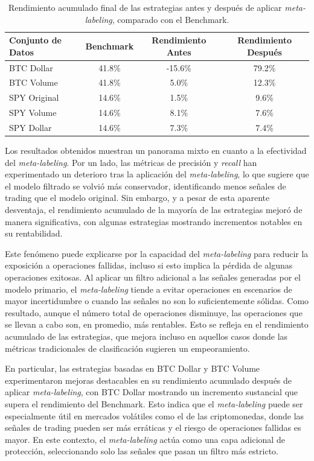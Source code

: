 \documentclass[a4paper,12pt, twoside]{report}
\begin{document}
\begin{table}[h!]
    \centering
    \begin{tabular}{lccc}
    \hline
    \textbf{Conjunto de Datos} & \textbf{Benchmark} & \textbf{Rendimiento Antes} & \textbf{Rendimiento Después} \\
    \hline
    BTC Dollar  & 41.8\% & -15.6\% & 79.2\% \\
    BTC Volume  & 41.8\% & 5.0\% & 12.3\% \\
    SPY Original  & 14.6\% & 1.5\% & 9.6\% \\
    SPY Volume  & 14.6\% & 8.1\% & 7.6\% \\
    SPY Dollar  & 14.6\% & 7.3\% & 7.4\% \\
    \hline
    \end{tabular}
    \caption{Rendimiento acumulado final de las estrategias antes y después de aplicar \textit{meta-labeling}, comparado con el Benchmark.}
    \label{tab:final_returns_comparison}
\end{table}
    

Los resultados obtenidos muestran un panorama mixto en cuanto a la efectividad del \textit{meta-labeling}. 
Por un lado, las métricas de precisión y \textit{recall} han experimentado un deterioro tras la aplicación 
del \textit{meta-labeling}, lo que sugiere que el modelo filtrado se volvió más conservador, identificando 
menos señales de trading que el modelo original. Sin embargo, y a pesar de esta aparente desventaja, el 
rendimiento acumulado de la mayoría de las estrategias mejoró de manera significativa, con algunas 
estrategias mostrando incrementos notables en su rentabilidad.

Este fenómeno puede explicarse por la capacidad del \textit{meta-labeling} para reducir la exposición 
a operaciones fallidas, incluso si esto implica la pérdida de algunas operaciones exitosas. Al aplicar 
un filtro adicional a las señales generadas por el modelo primario, el \textit{meta-labeling} tiende a 
evitar operaciones en escenarios de mayor incertidumbre o cuando las señales no son lo suficientemente 
sólidas. Como resultado, aunque el número total de operaciones disminuye, las operaciones que se llevan 
a cabo son, en promedio, más rentables. Esto se refleja en el rendimiento acumulado de las estrategias, 
que mejora incluso en aquellos casos donde las métricas tradicionales de clasificación sugieren un 
empeoramiento.

En particular, las estrategias basadas en BTC Dollar y BTC Volume experimentaron mejoras destacables 
en su rendimiento acumulado después de aplicar \textit{meta-labeling}, con BTC Dollar mostrando un 
incremento sustancial que supera el rendimiento del Benchmark. Esto indica que el \textit{meta-labeling} 
puede ser especialmente útil en mercados volátiles como el de las criptomonedas, donde las señales de 
trading pueden ser más erráticas y el riesgo de operaciones fallidas es mayor. En este contexto, el 
\textit{meta-labeling} actúa como una capa adicional de protección, seleccionando solo las señales 
que pasan un filtro más estricto.
\end{document}

